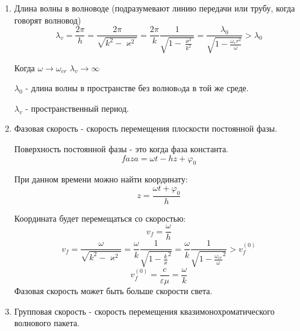 \documentclass[a4paper,14pt]{extarticle}
\renewcommand{\phi}{\varphi}
\renewcommand{\kappa}{\varkappa}
\begin{document}
\begin{enumerate}
%	
	
	\item Длина волны в волноводе (подразумевают линию передачи или трубу, когда говорят волновод)
	\begin{equation*}
	\lambda_v = \frac{2 \pi}{h} = \frac{2 \pi}{\sqrt{k^2 - \kappa^2}} = \frac{2 \pi}{k} \frac{1}{\sqrt{1 - \frac{\kappa^2}{k^2}}} = \frac{\lambda_0}{\sqrt{1 - \frac{\omega_cr^2}{\omega}}} > \lambda_0
	\end{equation*}
	
	Когда $\omega \rightarrow \omega_{cr}$	$\lambda_{v} \rightarrow \infty$
	
	$\lambda_0$ - длина волны в пространстве без волновoда в той же среде.
	
	$\lambda_{v}$ - пространственный период.
	
	\item Фазовая скорость - скорость перемещения плоскости постоянной фазы.
	
	Поверхность постоянной фазы - это когда фаза константа.
	\begin{equation*}
	faza = \omega t - h z + \phi_0
	\end{equation*}
	
	При данном времени можно найти координату:
	\begin{equation*}
	z = \frac{\omega t  + \phi_0}{ h }
	\end{equation*}
	
	Координата будет перемещаться со скоростью:
	\begin{equation*}
	v_f = \frac{\omega}{h}
	\end{equation*}
	\begin{equation*}
	v_f = 
	\frac{\omega}{\sqrt{k^2 - \kappa^2}} = 
	\frac{\omega}{k} \frac{1}{\sqrt{1 - {\frac{k}{\kappa}^2}}} = \frac{\omega}{k} \frac{1}{\sqrt{1 - {\frac{\omega_{cr}}{\omega}^2}}} > v_f^{(0)}
	\end{equation*}
	\begin{equation*}
	v_f^{(0)} = \frac{c}{\varepsilon \mu} = \frac{\omega}{k}
	\end{equation*}
	Фазовая скорость может быть больше скорости света.
	
	\item Групповая скорость - скорость перемещения квазимонохроматического волнового пакета. 	
	

\end{enumerate}
\end{document}
